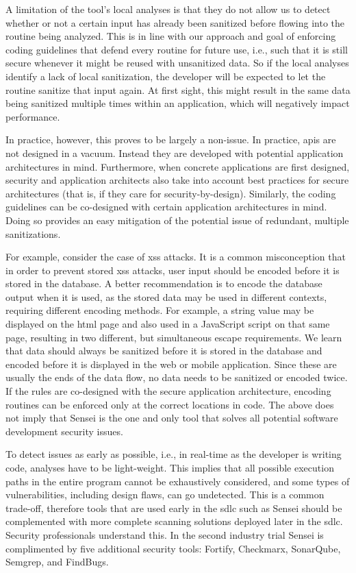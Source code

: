 A limitation of the tool's local analyses is that they do not allow us to detect whether or not a certain input has already been sanitized before flowing into the routine being analyzed.
This is in line with our approach and goal of enforcing coding guidelines that defend every routine for future use, i.e., such that it is still secure whenever it might be reused with unsanitized data.
So if the local analyses identify a lack of local sanitization, the developer will be expected to let the routine sanitize that input again.
At first sight, this might result in the same data being sanitized multiple times within an application, which will negatively impact performance. 

In practice, however, this proves to be largely a non-issue.
In practice, \glspl{api} are not designed in a vacuum.
Instead they are developed with potential application architectures in mind.
Furthermore, when concrete applications are first designed, security and application architects also take into account best practices for secure architectures (that is, if they care for security-by-design).
Similarly, the coding guidelines can be co-designed with certain application architectures in mind.
Doing so provides an easy mitigation of the potential issue of redundant, multiple sanitizations.

For example, consider the case of \gls{xss} attacks.
It is a common misconception that in order to prevent stored \gls{xss} attacks, user input should be encoded before it is stored in the database.
A better recommendation is to encode the database output when it is used, as the stored data may be used in different contexts, requiring different encoding methods.
For example, a string value may be displayed on the \gls{html} page and also used in a JavaScript script on that same page, resulting in two different, but simultaneous escape requirements.
We learn that data should always be sanitized before it is stored in the database and encoded before it is displayed in the web or mobile application.
Since these are usually the ends of the data flow, no data needs to be sanitized or encoded twice.
If the rules are co-designed with the secure application architecture, encoding routines can be enforced only at the correct locations in code. 
The above does not imply that Sensei is the one and only tool that solves all potential software development security issues.


To detect issues as early as possible, i.e., in real-time as the developer is writing code, analyses have to be light-weight.
This implies that all possible execution paths in the entire program cannot be exhaustively considered, and some types of vulnerabilities, including design flaws, can go undetected.
This is a common trade-off, therefore tools that are used early in the \gls{sdlc} such as Sensei should be complemented with more complete scanning solutions deployed later in the \gls{sdlc}.
Security professionals understand this.
In the second industry trial Sensei is complimented by five additional security tools: Fortify, Checkmarx, SonarQube, Semgrep, and FindBugs.


